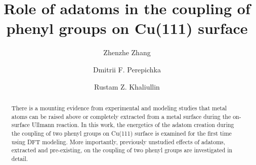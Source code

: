 \documentclass[%
 reprint,
 amsmath,amssymb,
 aps,
prb,
floatfix,
]{revtex4-2}
\begin{document}
\title{Role of adatoms in the coupling of phenyl groups on Cu(111) surface}

\author{Zhenzhe Zhang}
\author{Dmitrii F. Perepichka}%
\author{Rustam Z. Khaliullin}
%


\begin{abstract}


There is a mounting evidence from experimental and modeling studies that metal atoms can be raised above or completely extracted from a metal surface during the on-surface Ullmann reaction. In this work, the energetics of the adatom creation during the coupling of two phenyl groups on Cu(111) surface is examined for the first time using DFT modeling. More importantly, previously unstudied effects of adatoms, extracted and pre-existing, on the coupling of two phenyl groups are investigated in detail.
\end{abstract}

\maketitle




\end{document}

